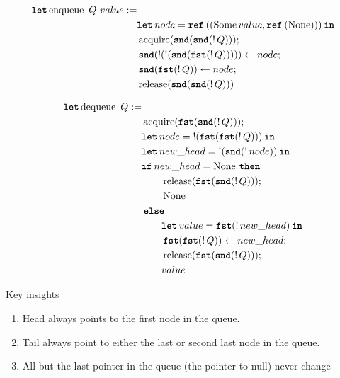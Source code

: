 \documentclass[twoside,11pt,openright]{report}
\newcommand{\acquire}{\operatorname{acquire}}
\newcommand{\release}{\operatorname{release}}
\newcommand{\enqueue}{\operatorname{enqueue}}
\newcommand{\dequeue}{\operatorname{dequeue}}
\begin{document}
\begin{align*}
  \langkw{let} \enqueue \ Q \ value :=&\\
		& \Let node = \Ref ((\Some value, \Ref(\None))) in\\
		& \acquire (\Snd (\Snd (\deref Q)));\\
		& \Snd (\deref(\deref(\Snd (\Fst(\deref Q))))) \gets node;\\
		& \Snd (\Fst (\deref Q)) \gets node;\\
		& \release (\Snd (\Snd (\deref Q)))
\end{align*}

\begin{align*}
  \langkw{let} \dequeue \ Q :=&\\ 
		& \acquire (\Fst (\Snd (\deref Q)));\\
		& \Let node = \deref (\Fst (\Fst (\deref Q))) in\\
		& \Let new\_head = \deref (\Snd(\deref node)) in\\
		& \If new\_head = \None then\\
			& \hspace{20pt} \release (\Fst (\Snd(\deref Q)));\\
			& \hspace{20pt} \None\\
		& \Else\\
			& \hspace{20pt} \Let value = \Fst (\deref new\_head) in\\
			& \hspace{20pt} \Fst (\Fst (\deref Q)) \gets new\_head;\\
			& \hspace{20pt} \release (\Fst (\Snd (\deref Q)));\\
      & \hspace{20pt} value
\end{align*}



Key insights
\begin{enumerate}
  \item\label{MSQTL:insights:head} Head always points to the first node in the queue.
  \item\label{MSQTL:insights:tail} Tail always point to either the last or second last node in the queue.
  \item\label{MSQTL:insights:persistent} All but the last pointer in the queue (the pointer to null) never change
\end{enumerate}
\end{document}
